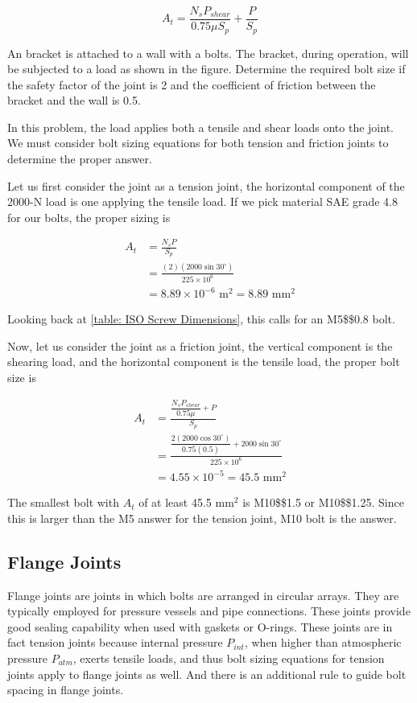 \documentclass[a4paper,openany,12pt]{book}
\begin{document}
{{$$A_t = \frac{N_s P_{shear}}{0.75\mu S_p } + \frac{P}{S_p}$$

An bracket is attached to a wall with a bolts. The bracket, during
operation, will be subjected to a load as shown in the figure. Determine
the required bolt size if the safety factor of the joint is 2 and the
coefficient of friction between the bracket and the wall is 0.5.


In this problem, the load applies both a tensile and shear loads onto
the joint. We must consider bolt sizing equations for both tension and
friction joints to determine the proper answer.

Let us first consider the joint as a tension joint, the horizontal
component of the 2000-N load is one applying the tensile load. If we
pick material SAE grade 4.8 for our bolts, the proper sizing is

$$\begin{aligned}
    A_t &= \frac{N_s P}{S_p} \\
        &= \frac{(2)(2000 \sin 30^{\circ})}{225 \times 10^6} \\
        &= 8.89 \times 10^{-6} \text{ m}^2 = 8.89 \text{ mm}^2
  \end{aligned}$$

Looking back at \ref{table: ISO Screw Dimensions}, this
calls for an M5\$\texttimes{}\$0.8 bolt.

Now, let us consider the joint as a friction joint, the vertical
component is the shearing load, and the horizontal component is the
tensile load, the proper bolt size is

$$\begin{aligned}
    A_t &= \frac{\dfrac{N_s P_{shear}}{0.75\mu } + P}{S_p} \\
        &= \frac{\dfrac{2(2000 \cos 30^{\circ})}{0.75(0.5)} + 2000 \sin 30^{\circ}}{225 \times 10^6} \\
        &= 4.55 \times 10^{-5} = 45.5 \text{ mm}^2
  \end{aligned}$$

The smallest bolt with \(A_t\) of at least 45.5 mm\(^2\) is M10\$\texttimes{}\$1.5
or M10\$\texttimes{}\$1.25. Since this is larger than the M5 answer for the
tension joint, M10 bolt is the answer.

\subsection{Flange Joints}
\label{flange-joints}
Flange joints are joints in which bolts are arranged in circular arrays.
They are typically employed for pressure vessels and pipe connections.
These joints provide good sealing capability when used with gaskets or
O-rings. These joints are in fact tension joints because internal
pressure \(P_{int}\), when higher than atmospheric pressure \(P_{atm}\),
exerts tensile loads, and thus bolt sizing equations for tension joints
apply to flange joints as well. And there is an additional rule to guide
bolt spacing in flange joints.


}}
\end{document}
